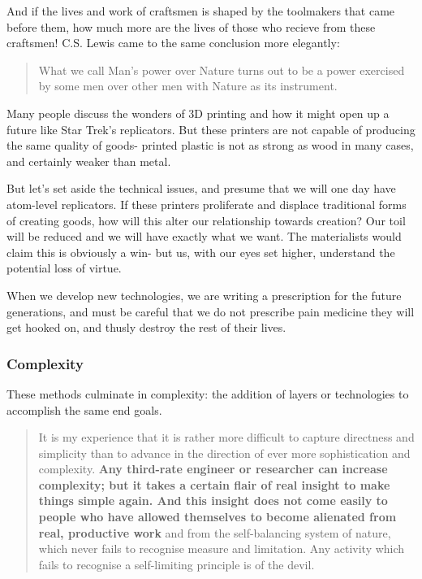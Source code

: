 \documentclass[letterpaper]{article}
\begin{document}
And if the lives and work of craftsmen is shaped by the toolmakers that came before them, how much more are the lives of those who recieve from these craftsmen! C.S. Lewis came to the same conclusion more elegantly:

\begin{quote}
  What we call Man's power over Nature turns out to be a power exercised by some men over other men with Nature as its instrument.
\end{quote}

Many people discuss the wonders of 3D printing and how it might open up a future like Star Trek's replicators. But these printers are not capable of producing the same quality of goods- printed plastic is not as strong as wood in many cases, and certainly weaker than metal.

But let's set aside the technical issues, and presume that we will one day have atom-level replicators. If these printers proliferate and displace traditional forms of creating goods, how will this alter our relationship towards creation? Our toil will be reduced and we will have exactly what we want. The materialists would claim this is obviously a win- but us, with our eyes set higher, understand the potential loss of virtue.

When we develop new technologies, we are writing a prescription for the future generations, and must be careful that we do not prescribe pain medicine they will get hooked on, and thusly destroy the rest of their lives.

\subsubsection{Complexity}

These methods culminate in complexity: the addition of layers or technologies to accomplish the same end goals.

\begin{quote}
  It is my experience that it is rather more difficult to capture directness and simplicity than to advance in the direction of ever more sophistication and complexity. \textbf{Any third-rate engineer or researcher can increase complexity; but it takes a certain flair of real insight to make things simple again. And this insight does not come easily to people who have allowed themselves to become alienated from real, productive work} and from the self-balancing system of nature, which never fails to recognise measure and limitation. Any activity which fails to recognise a self-limiting principle is of the devil.
\end{quote}
\end{document}
